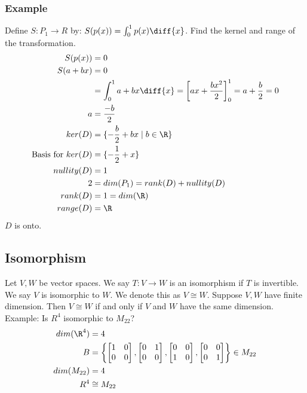 \documentclass{math}
\begin{document}
\subsubsection*{Example}
Define \( S:P_1\to R \) by: \( S(p(x)) = \int_{0}^{1}p(x)\diff{x} \). Find the
kernel and range of the transformation.
\begin{align*}
  S(p(x)) &= 0 \\
  S(a+bx) &= 0 \\
  &= \int_{0}^{1}a+bx\diff{x} = \bigg[ax+\frac{bx^2}{2}\bigg]_{0}^{1} =
    a+\frac{b}{2} = 0 \\
  a &= \frac{-b}{2} \\
  ker(D) &= \{-\frac{b}{2}+bx\mid b\in\R\} \\
  \text{Basis for } ker(D) &= \{-\frac{1}{2}+x\} \\
  nullity(D) &= 1 \\
  2 &= dim(P_1) = rank(D)+nullity(D) \\
  rank(D) &= 1 = dim(\R) \\
  range(D) &= \R
\end{align*}
\( D \) is onto.

\subsection*{Isomorphism}
Let \( V,W \) be vector spaces. We say \( T:V\to W \) is an isomorphism if
\( T \) is invertible. We say \( V \) is isomorphic to \( W \). We denote this
as \( V\cong W \). Suppose \( V,W \) have finite dimension. Then \( V\cong W \)
if and only if \( V \) and \( W \) have the same dimension. Example: Is
\( R^4 \) isomorphic to \( M_{22} \)?
\begin{align*}
  dim(\R^4) &= 4 \\
  B &= \left\{
    \begin{bmatrix}1 & 0 \\ 0 & 0\end{bmatrix},
    \begin{bmatrix}0 & 1 \\ 0 & 0\end{bmatrix},
    \begin{bmatrix}0 & 0 \\ 1 & 0\end{bmatrix},
    \begin{bmatrix}0 & 0 \\ 0 & 1\end{bmatrix}
  \right\}\in M_{22} \\
  dim(M_{22}) &= 4 \\
  R^4 &\cong M_{22}
\end{align*}
\end{document}
